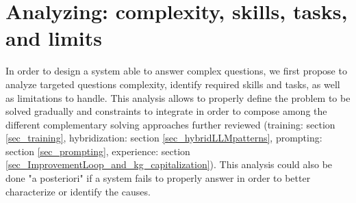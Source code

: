 \documentclass[acmsmall]{acmart}
\begin{document}
\section{Analyzing: complexity, skills, tasks, and limits}\label{sec_skills_tasks_limits}
In order to design a system able to answer complex questions, we first propose to analyze targeted questions complexity, identify required skills and tasks, as well as limitations to handle. This analysis allows to properly define the problem to be solved gradually and constraints to integrate in order to compose among the different complementary solving approaches further reviewed (training: section \ref{sec_training}, hybridization: section \ref{sec_hybridLLMpatterns}, prompting: section \ref{sec_prompting}, experience: section \ref{sec_ImprovementLoop_and_kg_capitalization}). This analysis could also be done "a posteriori" if a system fails to properly answer in order to better characterize or identify the causes.
\end{document}
